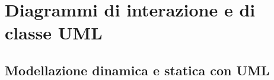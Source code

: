 \chapter{Diagrammi di interazione e di classe UML}

\section{Modellazione dinamica e statica con UML}